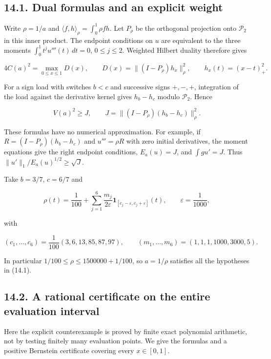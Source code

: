 \documentclass[11pt]{article}
\begin{document}
\subsection{14.1. Dual formulas and an explicit
weight}\label{dual-formulas-and-an-explicit-weight}

Write \(\rho=1/a\) and \(\langle f,h\rangle_\rho=\int_0^1\rho fh\). Let
\(P_\rho\) be the orthogonal projection onto \(\mathcal P_2\) in this
inner product. The endpoint conditions on \(u\) are equivalent to the
three moments \(\int_0^1t^j u'''(t)\,dt=0\), \(0\le j\le2\). Weighted
Hilbert duality therefore gives

\[
4C(a)^2=\max_{0\le x\le1}D(x),\qquad
D(x)=\|(I-P_\rho)h_x\|_\rho^2,\qquad h_x(t)=(x-t)_+^2.
\tag{14.3}
\]

For a sign load with switches \(b<c\) and successive signs \(+,-,+\),
integration of the load against the derivative kernel gives \(h_b-h_c\)
modulo \(\mathcal P_2\). Hence

\[
V(a)^2\ge J,\qquad J=\|(I-P_\rho)(h_b-h_c)\|_\rho^2.
\tag{14.4}
\]

These formulas have no numerical approximation. For example, if
\(R=(I-P_\rho)(h_b-h_c)\) and \(u'''=\rho R\) with zero initial
derivatives, the moment equations give the right endpoint conditions,
\(E_a(u)=J\), and \(\int gu'=J\). Thus
\(\|u'\|_1/E_a(u)^{1/2}\ge\sqrt J\).

Take \(b=3/7\), \(c=6/7\) and

\[
\rho(t)=\frac1{100}+\sum_{j=1}^6\frac{m_j}{2\varepsilon}
\mathbf1_{[c_j-\varepsilon,c_j+\varepsilon]}(t),\qquad
\varepsilon=\frac1{1000},
\tag{14.5}
\]

with

\[
(c_1,\ldots,c_6)=\frac1{100}(3,6,13,85,87,97),\qquad
(m_1,\ldots,m_6)=(1,1,1,1000,3000,5).
\tag{14.6}
\]

In particular \(1/100\le\rho\le1500000+1/100\), so \(a=1/\rho\)
satisfies all the hypotheses in (14.1).

\subsection{14.2. A rational certificate on the entire evaluation
interval}\label{a-rational-certificate-on-the-entire-evaluation-interval}

Here the explicit counterexample is proved by finite exact polynomial
arithmetic, not by testing finitely many evaluation points. We give the
formulas and a positive Bernstein certificate covering every
\(x\in[0,1]\).
\end{document}
